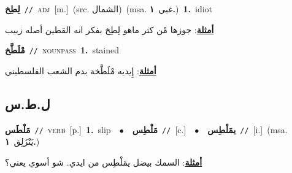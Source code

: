 \documentclass[10pt,a4paper,twoside]{article} %
\begin{document}
\begin{multicols}{2}
{\setlength\topsep{0pt}\textbf{\foreignlanguage{arabic}{لِطِخ}}\ {\color{gray}\texttt{//}\color{black}}\ \textsc{adj}\ [m.]\ (src. \color{gray}\foreignlanguage{arabic}{الشمال}\color{black})\ \color{gray}(msa. \foreignlanguage{arabic}{غبي}~\foreignlanguage{arabic}{\textbf{١.}})\color{black}\ \textbf{1.}~idiot\  \begin{flushright}\color{gray}\foreignlanguage{arabic}{\textbf{\underline{\foreignlanguage{arabic}{أمثلة}}}: جوزها مْن كثر ماهو لِطِخ بفكر انه القطين أصله زبيب}\end{flushright}\color{black}} \vspace{2mm}

{\setlength\topsep{0pt}\textbf{\foreignlanguage{arabic}{مْلَطَّخ}}\ {\color{gray}\texttt{//}\color{black}}\ \textsc{noun\textunderscore pass}\ \textbf{1.}~stained\  \begin{flushright}\color{gray}\foreignlanguage{arabic}{\textbf{\underline{\foreignlanguage{arabic}{أمثلة}}}: إِيديه مْلَطَّخة بدم الشعب الفلسطيني}\end{flushright}\color{black}} \vspace{2mm}

\vspace{-3mm}
\subsection*{\color{blue}\foreignlanguage{arabic}{ل.ط.س}\color{blue}{}} 

{\setlength\topsep{0pt}\textbf{\foreignlanguage{arabic}{مَلْطَس}}\ {\color{gray}\texttt{//}\color{black}}\ \textsc{verb}\ [p.]\ \textbf{1.}~slip\ \ $\bullet$\ \ \setlength\topsep{0pt}\textbf{\foreignlanguage{arabic}{مَلْطِس}}\ {\color{gray}\texttt{//}\color{black}}\ [c.]\ \ $\bullet$\ \ \setlength\topsep{0pt}\textbf{\foreignlanguage{arabic}{يمَلْطِس}}\ {\color{gray}\texttt{//}\color{black}}\ [i.]\ \color{gray}(msa. \foreignlanguage{arabic}{يَنْزَلِق}~\foreignlanguage{arabic}{\textbf{١.}})\color{black}\  \begin{flushright}\color{gray}\foreignlanguage{arabic}{\textbf{\underline{\foreignlanguage{arabic}{أمثلة}}}: السمك بيضل يمَلْطِس من ايدي. شو أسوي يعني؟}\end{flushright}\color{black}} \vspace{2mm}


\end{multicols}
\end{document}
